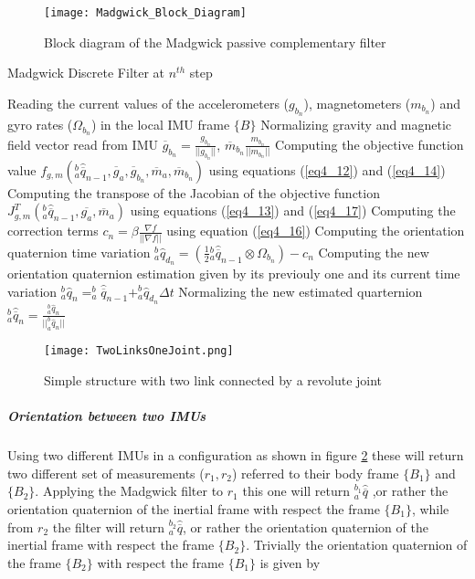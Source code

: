 \begin{figure}[t]
\texttt{[image: Madgwick\_Block\_Diagram]}
\caption{Block diagram of the Madgwick passive complementary filter}
\label{BlockDiagram} 
\end{figure}

\begin{algorithm}
\caption{Madgwick Discrete Filter at $n^{th}$ step}
\begin{algorithmic}[1]
\label{MadgwickAlg}
\STATE Reading the current values of the accelerometers ($g_{b_n}$), magnetometers ($m_{b_n}$) and gyro rates ($\Omega_{b_n}$) in the local IMU frame $\{B\}$
\STATE Normalizing gravity and magnetic field vector read from IMU $\overline{g}_{b_n} = \frac{g_{b_n}}{\vert \vert g_{b_n} \vert \vert}$, $\overline{m}_{b_n} \frac{m_{b_n}}{\vert \vert m_{b_n} \vert \vert}$
\STATE Computing the objective function value $f_{g,m}({^b_a\hat{\overline{q}}_{n-1}},\overline{g}_a,\overline{g}_{b_n},\overline{m}_a,\overline{m}_{b_n})$ using equations (\ref{eq4_12}) and (\ref{eq4_14})
\STATE Computing the transpose of the Jacobian of the objective function $J^T_{g,m}(^b_a\hat{\overline{q}}_{n-1},\overline{g_a},\overline{m}_a)$ using equations (\ref{eq4_13}) and (\ref{eq4_17})
\STATE Computing the correction terms $c_n =  \beta \frac{\nabla f}{\vert \vert \nabla f \vert \vert}$ using equation (\ref{eq4_16})
\STATE Computing the orientation quaternion time variation $^b_a \hat{q}_{d_n} =  (\frac{1}{2} {^b_a\hat{\overline{q}}_{n-1}} \otimes \Omega_{b_n}) - c_n$
\STATE Computing the new orientation quaternion estimation given by its previouly one and its current time variation $^b_a \hat{q}_n = ^b_a\hat{\overline{q}}_{n-1} + ^b_a \hat{q}_{d_n} \Delta t$
\STATE Normalizing the new estimated quarternion $^b_a \hat{\overline{q}}_n = \frac{^b_a \hat{q}_n}{\vert \vert ^b_a \hat{q}_n \vert \vert}$ 
\end{algorithmic}
\end{algorithm}

\begin{figure}[t]
\centering
\texttt{[image: TwoLinksOneJoint.png]}
\caption{Simple structure with two link connected by a revolute joint}
\label{TwoLinksOneJoint}
\end{figure}

\subparagraph{Orientation between two IMUs}

Using two different IMUs in a configuration as shown in figure \ref{TwoLinksOneJoint} these will return two different set of measurements ($r_1,r_2$) referred to their body frame $\{ B_1 \}$ and $\{ B_2 \}$. Applying the Madgwick filter to $r_1$ this one will return $^{b{_1}}_a \hat{\overline{q}}$ ,or rather the orientation quaternion of the inertial frame with respect the frame $\{ B_1 \}$, while from $r_2$ the filter will return $^{b{_2}}_a \hat{\overline{q}}$, or rather the orientation quaternion of the inertial frame with respect the frame $\{ B_2 \}$. Trivially the orientation quaternion of the frame $\{ B_2 \}$ with respect the frame $\{ B_1 \}$ is given by



